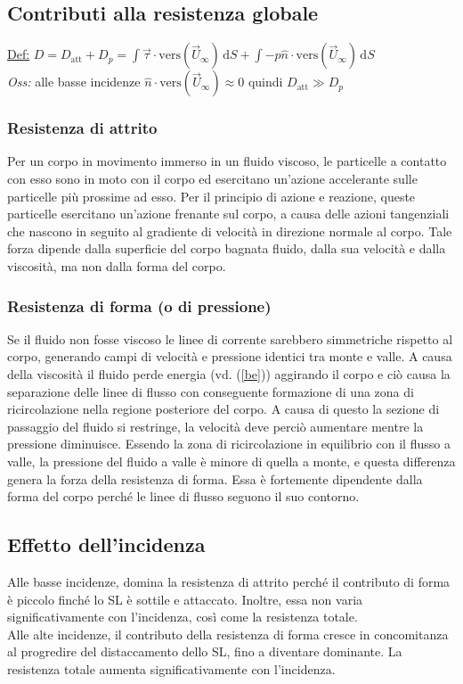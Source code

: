 \documentclass[11pt,a4paper]{report}
\newcommand{\de}{\mathrm d}
\begin{document}
		\subsection{Contributi alla resistenza globale}
		\underline{Def:} $D=D_\mathrm{att}+D_p=\int\vec\tau\cdot\mathrm{vers}(\vec U_\infty)\,\de S+\int -p\hat n\cdot\mathrm{vers}(\vec U_\infty)\,\de S$\\
		\textit{Oss:} alle basse incidenze $\hat n\cdot\mathrm{vers}(\vec U_\infty)\approx 0$ quindi $D_\mathrm{att}\gg D_p$
			\subsubsection{Resistenza di attrito}
			Per un corpo in movimento immerso in un fluido viscoso, le particelle a contatto con esso sono in moto con il corpo ed esercitano un'azione accelerante sulle particelle più prossime ad esso. Per il principio di azione e reazione, queste particelle esercitano un'azione frenante sul corpo, a causa delle azioni tangenziali che nascono in seguito al gradiente di velocità in direzione normale al corpo. Tale forza dipende dalla superficie del corpo bagnata fluido, dalla sua velocità e dalla viscosità, ma non dalla forma del corpo.
			\subsubsection{Resistenza di forma (o di pressione)}
			Se il fluido non fosse viscoso le linee di corrente sarebbero simmetriche rispetto al corpo, generando campi di velocità e pressione identici tra monte e valle. A causa della viscosità il fluido perde energia \big(vd. (\ref{be})\big) aggirando il corpo e ciò causa la separazione delle linee di flusso con conseguente formazione di una zona di ricircolazione nella regione posteriore del corpo. A causa di questo la sezione di passaggio del fluido si restringe, la velocità deve perciò aumentare mentre la pressione diminuisce. Essendo la zona di ricircolazione in equilibrio con il flusso a valle, la pressione del fluido a valle è minore di quella a monte, e questa differenza genera la forza della resistenza di forma. Essa è fortemente dipendente dalla forma del corpo perché le linee di flusso seguono il suo contorno.
		\subsection{Effetto dell'incidenza}
		Alle basse incidenze, domina la resistenza di attrito perché il contributo di forma è piccolo finché lo SL è sottile e attaccato. Inoltre, essa non varia significativamente con l'incidenza, così come la resistenza totale.\\		
		Alle alte incidenze, il contributo della resistenza di forma cresce in concomitanza al progredire del distaccamento dello SL, fino a diventare dominante. La resistenza totale aumenta significativamente con l'incidenza.
\end{document}
